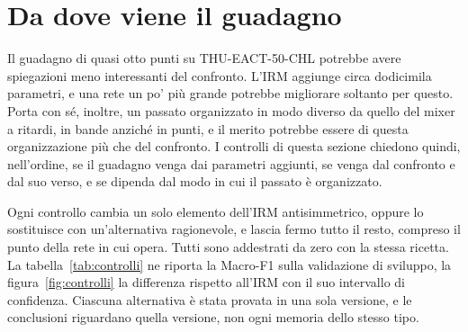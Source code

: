
\section{Da dove viene il guadagno}
\label{sec:controlli_irm}

Il guadagno di quasi otto punti su THU-EACT-50-CHL potrebbe avere spiegazioni meno interessanti del confronto. L'IRM aggiunge circa dodicimila parametri, e una rete un po' più grande potrebbe migliorare soltanto per questo. Porta con sé, inoltre, un passato organizzato in modo diverso da quello del mixer a ritardi, in bande anziché in punti, e il merito potrebbe essere di questa organizzazione più che del confronto. I controlli di questa sezione chiedono quindi, nell'ordine, se il guadagno venga dai parametri aggiunti, se venga dal confronto e dal suo verso, e se dipenda dal modo in cui il passato è organizzato.

Ogni controllo cambia un solo elemento dell'IRM antisimmetrico, oppure lo sostituisce con un'alternativa ragionevole, e lascia fermo tutto il resto, compreso il punto della rete in cui opera. Tutti sono addestrati da zero con la stessa ricetta. La tabella~\ref{tab:controlli} ne riporta la Macro-F1 sulla validazione di sviluppo, la figura~\ref{fig:controlli} la differenza rispetto all'IRM con il suo intervallo di confidenza. Ciascuna alternativa è stata provata in una sola versione, e le conclusioni riguardano quella versione, non ogni memoria dello stesso tipo.

